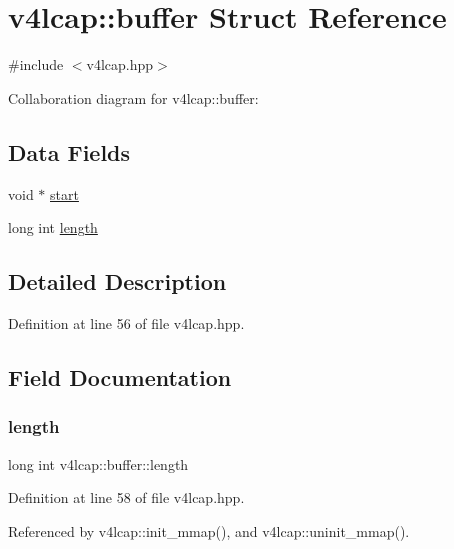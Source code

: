 \hypertarget{structv4lcap_1_1buffer}{}\section{v4lcap\+:\+:buffer Struct Reference}
\label{structv4lcap_1_1buffer}


{\ttfamily \#include $<$v4lcap.\+hpp$>$}



Collaboration diagram for v4lcap\+:\+:buffer\+:
\subsection*{Data Fields}
\begin{DoxyCompactItemize}
\item 
void $\ast$ \hyperlink{structv4lcap_1_1buffer_ae4fca9eb7724f4a93ee14537fb34597e}{start}
\item 
long int \hyperlink{structv4lcap_1_1buffer_a63df371d2260a5daf5e948cf4ccef703}{length}
\end{DoxyCompactItemize}


\subsection{Detailed Description}


Definition at line 56 of file v4lcap.\+hpp.



\subsection{Field Documentation}
\mbox{\label{structv4lcap_1_1buffer_a63df371d2260a5daf5e948cf4ccef703}} 
\subsubsection{\texorpdfstring{length}{length}}
{\footnotesize\ttfamily long int v4lcap\+::buffer\+::length}



Definition at line 58 of file v4lcap.\+hpp.



Referenced by v4lcap\+::init\+\_\+mmap(), and v4lcap\+::uninit\+\_\+mmap().

\mbox{\label{structv4lcap_1_1buffer_ae4fca9eb7724f4a93ee14537fb34597e}} 
